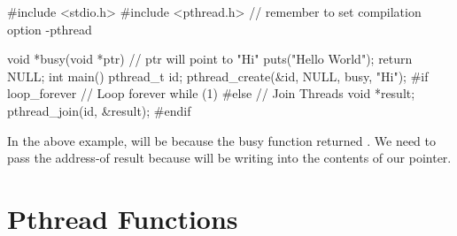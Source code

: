 \begin{code}[language=C]
#include <stdio.h>
#include <pthread.h>
// remember to set compilation option -pthread

void *busy(void *ptr) {
// ptr will point to "Hi"
    puts("Hello World");
    return NULL;
}
int main() {
    pthread_t id;
    pthread_create(&id, NULL, busy, "Hi");
#if loop_forever // Loop forever
    while (1) {}
#else // Join Threads
    void *result;
    pthread_join(id, &result);
#endif
}
\end{code}

In the above example,  will be  because the busy function returned . We need to pass the address-of result because  will be writing into the contents of our pointer.

\section{Pthread Functions}\label{more-pthread-functions}

